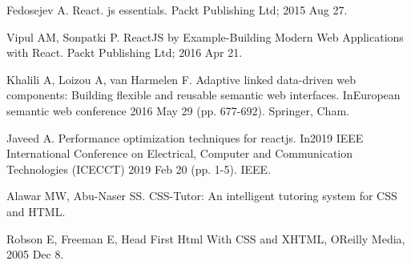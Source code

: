 \begin{thebibliography}{1}
Fedosejev A. React. js essentials. Packt Publishing Ltd; 2015 Aug 27.


Vipul AM, Sonpatki P. ReactJS by Example-Building Modern Web Applications with React. Packt Publishing Ltd; 2016 Apr 21.

Khalili A, Loizou A, van Harmelen F. Adaptive linked data-driven web components: Building flexible and reusable semantic web interfaces. InEuropean semantic web conference 2016 May 29 (pp. 677-692). Springer, Cham.

Javeed A. Performance optimization techniques for reactjs. In2019 IEEE International Conference on Electrical, Computer and Communication Technologies (ICECCT) 2019 Feb 20 (pp. 1-5). IEEE.

Alawar MW, Abu-Naser SS. CSS-Tutor: An intelligent tutoring system for CSS and HTML.

Robson E, Freeman E, Head First Html With CSS and XHTML, OReilly Media, 2005 Dec 8.













\end{thebibliography}

